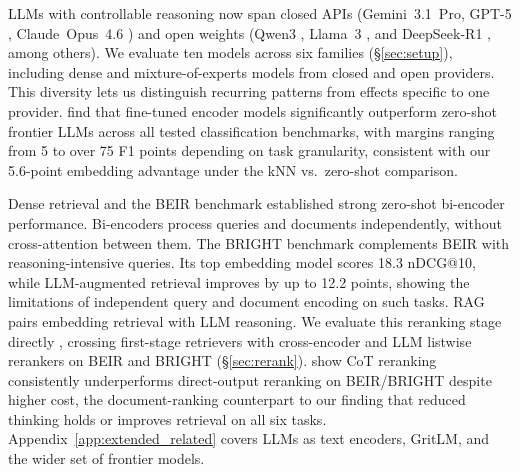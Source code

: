 LLMs with controllable reasoning now span closed APIs (Gemini~3.1~Pro, GPT-5 \citep{singh2026openaigpt5card}, Claude~Opus~4.6 \citep{anthropic2026claudeopus46}) and open weights (Qwen3 \citep{yang2025qwen3technicalreport}, Llama~3 \citep{grattafiori2024llama3herdmodels}, and DeepSeek-R1 \citep{deepseekai2025deepseekr1incentivizingreasoningcapability}, among others).
We evaluate ten models across six families (\S\ref{sec:setup}), including dense and mixture-of-experts models from closed and open providers. This diversity lets us distinguish recurring patterns from effects specific to one provider.
\citet{bucher2024finetuned} find that fine-tuned encoder models significantly outperform zero-shot frontier LLMs across all tested classification benchmarks, with margins ranging from 5 to over 75 F1 points depending on task granularity, consistent with our 5.6-point embedding advantage under the kNN vs.\ zero-shot comparison.

Dense retrieval \citep{karpukhin2020dpr} and the BEIR benchmark \citep{thakur2021beir} established strong zero-shot bi-encoder performance. Bi-encoders process queries and documents independently, without cross-attention between them.
The BRIGHT benchmark \citep{su2024bright} complements BEIR with reasoning-intensive queries. Its top embedding model scores 18.3 nDCG@10, while LLM-augmented retrieval improves by up to 12.2 points, showing the limitations of independent query and document encoding on such tasks.
RAG \citep{lewis2020rag, gao2024retrievalaugmentedgenerationlargelanguage} pairs embedding retrieval with LLM reasoning. We evaluate this reranking stage directly \citep{sun2023rankgpt}, crossing first-stage retrievers with cross-encoder and LLM listwise rerankers on BEIR and BRIGHT (\S\ref{sec:rerank}).
\citet{lu2025cothurts} show CoT reranking consistently underperforms direct-output reranking on BEIR/BRIGHT despite higher cost, the document-ranking counterpart to our finding that reduced thinking holds or improves retrieval on all six tasks.
Appendix~\ref{app:extended_related} covers LLMs as text encoders, GritLM, and the wider set of frontier models.
